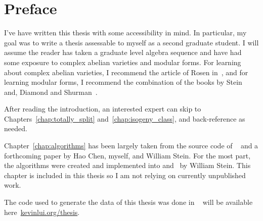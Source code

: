 \chapter*{Preface}

I've have written this thesis with some accessibility in mind. In particular,
my goal was to write a thesis assessable to myself as a second graduate
student. I will assume the reader has taken a graduate level algebra sequence
and have had some exposure to complex abelian varieties and modular forms. For
learning about complex abelian varieties, I recommend the article of Rosen
in~\cite{mr89b:14029}, and for learning modular forms, I recommend the
combination of the books by Stein~\cite{stein:modform} and, Diamond and
Shurman~\cite{diamond-shurman}.

After reading the introduction, an interested expert can skip to
Chapters~\ref{chap:totally_split} and~\ref{chap:isogeny_class}, and
back-reference as needed.

Chapter~\ref{chap:algorithms} has been largely taken from the source code of
\sage~\cite{sage} and a forthcoming paper by Hao Chen, myself, and William Stein. For the
most part, the algorithms were created and implemented into \sage and \magma~by
William Stein. This chapter is included in this thesis so I am not relying on
currently unpublished work.

The code used to generate the data of this thesis was done in \sage~\cite{sage}
will be available here~\url{kevinlui.org/thesis}.
